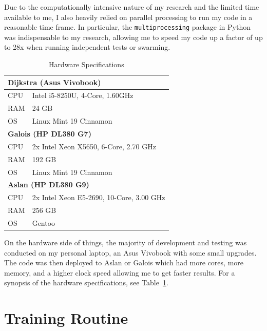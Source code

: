 \documentclass[oneside,12pt,openany]{book}
\begin{document}
	Due to the computationally intensive nature of my research and the limited time available to me, I also heavily relied on parallel processing to run my code in a reasonable time frame. In particular, the \texttt{multiprocessing} package in Python was indispensable to my research, allowing me to speed my code up a factor of up to 28x when running independent tests or swarming.
	
	\begin{table}[!ht]
		\centering
		\begin{tabular}{|l|l|}
			\hline
			\multicolumn{2}{|l|}{\textbf{Dijkstra (Asus Vivobook)}} \\ \hline
			CPU     & Intel i5-8250U, 4-Core, 1.60GHz     \\ \hline
			RAM     & 24 GB                                \\ \hline
			OS      & Linux Mint 19 Cinnamon               \\ \hline
			\multicolumn{2}{|l|}{\textbf{Galois (HP DL380 G7)}}     \\ \hline
			CPU     &  2x Intel Xeon X5650, 6-Core, 2.70 GHz       \\ \hline
			RAM     & 192 GB                               \\ \hline
			OS      & Linux Mint 19 Cinnamon               \\ \hline
			\multicolumn{2}{|l|}{\textbf{Aslan (HP DL380 G9)}}                         \\ \hline
			CPU&    2x  Intel Xeon E5-2690, 10-Core, 3.00 GHz    \\ \hline
			RAM&    256 GB                                  \\ \hline
			OS&    Gentoo                               \\ \hline
		\end{tabular}
		\caption{Hardware Specifications}
		\label{tab:hardware}
	\end{table}

	On the hardware side of things, the majority of development and testing was conducted on my personal laptop, an Asus Vivobook with some small upgrades. The code was then deployed to Aslan or Galois which had more cores, more memory, and a higher clock speed allowing me to get faster results. For a synopsis of the hardware specifications, see Table~\ref{tab:hardware}. 
	
	\section{Training Routine}\label{sec:exp:train}
	
\end{document}
